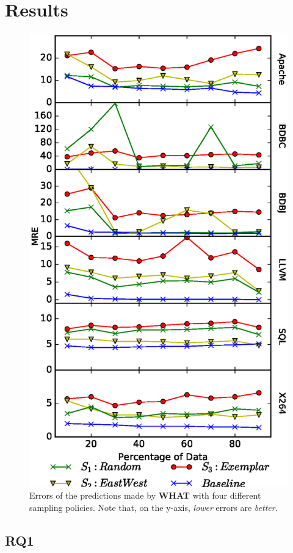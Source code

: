 \documentclass{sig-alternative}
\newcommand{\what}{{\bf WHAT }}
\begin{document}
\section{Results}


\begin{figure}[!t]
\includegraphics[width=0.9\linewidth]{Figures/SamplingAccuracy.eps}
\caption{Errors of the predictions made by \what with four different
sampling policies. Note that, on the y-axis,  {\em lower} errors are {\em better}.
}
\label{fig:sampling_accuracy}
\end{figure}

\subsection{RQ1}
\end{document}
